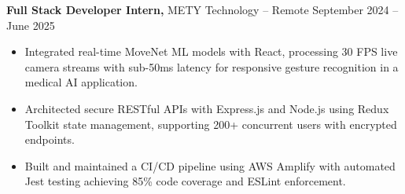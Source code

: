 \documentclass[11pt]{article}       %
\begin{document}
\textbf{Full Stack Developer Intern,} {METY Technology} -- Remote \hfill September 2024 -- June 2025 
\vspace{-9pt}
\begin{itemize}
  \item Integrated real-time MoveNet ML models with React, processing 30 FPS live camera streams with sub-50ms latency for responsive gesture recognition in a medical AI application.
  \item Architected secure RESTful APIs with Express.js and Node.js using Redux Toolkit state management, supporting 200+ concurrent users with encrypted endpoints.
  \item Built and maintained a CI/CD pipeline using AWS Amplify with automated Jest testing achieving 85\% code coverage and ESLint enforcement.
\end{itemize}

\end{document}
